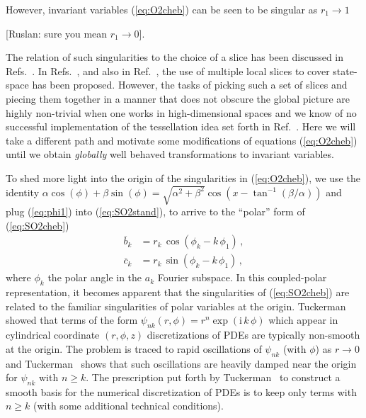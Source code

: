 \documentclass[aip,cha,showpacs,twocolumn,
 		  reprint]{revtex4-1} %
\newcommand{\bseq}{\begin{subequations}}
\newcommand{\eseq}{\end{subequations}}
\newcommand{\rf}     [1] {~\cite{#1}}
\newcommand{\refref} [1] {Ref.~\cite{#1}}
\newcommand{\refrefs}[1] {Refs.~\cite{#1}}
\newcommand{\refeq}  [1] {(\ref{#1})}
\newcommand{\ii}{\ensuremath{\mathrm{i}}} %
\begin{document}
However, invariant variables \refeq{eq:O2cheb} can be seen to be singular as
$r_1\rightarrow1$ 

[Ruslan: sure you mean $r_1\rightarrow0$]. 

The relation of such singularities to the choice of a slice
has been discussed in \refrefs{SiminosThesis, SiCvi10, FrCv11}. In
\refrefs{SiCvi10, FrCv11}, and also in \refref{rowley_reconstruction_2000},
the use of multiple local slices to cover state-space has been proposed.
However, the tasks of picking such a set of slices
and piecing them together in a manner that does not obscure the global picture
are highly non-trivial when one works in high-dimensional spaces and we know
of no successful implementation of the tessellation idea set forth in
\refref{FrCv11}. Here we will take a different path and motivate some
modifications of equations \refeq{eq:O2cheb} until we obtain
\emph{globally} well behaved transformations to invariant variables.

To shed more light into the origin of the singularities in \refeq{eq:O2cheb},
we use the identity
$\alpha\cos(\phi)+\beta\sin(\phi)=\sqrt{\alpha^2+\beta^2}\cos(x-\tan^{-1}(\beta/\alpha))$
and plug \refeq{eq:phi1} into \refeq{eq:SO2stand}, to arrive to the
``polar'' form of \refeq{eq:SO2cheb}
\bseq\label{eq:SO2polar}
  \begin{align}
    \overline{b}_k &=
		    r_k\, \cos(\phi_k-k\,\phi_1)\,, \label{eq:SO2polar1}\\
    \overline{c}_k &=
		    r_k\, \sin(\phi_k-k\,\phi_1)\,,\label{eq:SO2polar2}
  \end{align}
\eseq
where $\phi_k$ the polar angle in the $a_k$ Fourier subspace. In this coupled-polar
representation, it becomes apparent that the singularities of \refeq{eq:SO2cheb}
are related to the familiar singularities of polar variables at the origin.
Tuckerman\rf{tuckerman89} showed that terms of the form $\psi_{nk}(r,\phi)=r^n\exp(\ii\, k\,\phi)$
which appear in cylindrical coordinate $(r,\phi,z)$ discretizations of PDEs
are typically non-smooth at the origin. The problem is traced to rapid
oscillations of $\psi_{nk}$ (with $\phi$) as $r\rightarrow0$ and Tuckerman\rf{tuckerman89} shows
that such oscillations are heavily damped near the origin for
$\psi_{nk}$ with $n\geq k$. The prescription put forth by Tuckerman\rf{tuckerman89} to
construct a smooth basis for the numerical discretization of
PDEs is to keep only terms with $n\geq k$
(with some additional technical conditions).
\end{document}
